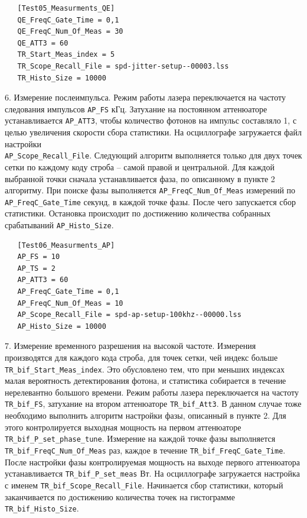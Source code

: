 \documentclass[12pt]{article}
\begin{document}
\begin{lstlisting}  
   [Test05_Measurments_QE]
   QE_FreqC_Gate_Time = 0,1
   QE_FreqC_Num_Of_Meas = 30
   QE_ATT3 = 60
   TR_Start_Meas_index = 5
   TR_Scope_Recall_File = spd-jitter-setup--00003.lss
   TR_Histo_Size = 10000
\end{lstlisting}

6. Измерение послеимпульса. Режим работы лазера переключается на частоту следования импульсов \verb|AP_FS| кГц. Затухание на постоянном аттенюаторе устанавливается \verb|AP_ATT3|, чтобы количество фотонов на импульс составляло 1, с целью увеличения скорости сбора статистики. На осциллографе загружается файл настройки \\ \verb|AP_Scope_Recall_File|. Следующий алгоритм выполняется только для двух точек сетки по каждому коду строба -- самой правой и центральной. Для каждой выбранной точки сначала устанавливается фаза, по описанному в пункте 2 алгоритму. При поиске фазы выполняется \verb|AP_FreqC_Num_Of_Meas| измерений по \verb|AP_FreqC_Gate_Time| секунд, в каждой точке фазы. После чего запускается сбор статистики. Остановка происходит по достижению количества собранных срабатываний \verb|AP_Histo_Size|.  


\begin{lstlisting}
   [Test06_Measurments_AP]
   AP_FS = 10
   AP_TS = 2
   AP_ATT3 = 60
   AP_FreqC_Gate_Time = 0,1
   AP_FreqC_Num_Of_Meas = 10
   AP_Scope_Recall_File = spd-ap-setup-100khz--00000.lss
   AP_Histo_Size = 10000
\end{lstlisting}

7. Измерение временного разрешения на высокой частоте. Измерения производятся для каждого кода строба, для точек сетки, чей индекс больше \verb|TR_bif_Start_Meas_index|. Это обусловлено тем, что при меньших индексах малая вероятность детектирования фотона, и статистика собирается в течение нерелевантно большого времени.  Режим работы лазера переключается на частоту \verb|TR_bif_FS|, затухание на втором аттенюаторе \verb|TR_bif_Att3|. В данном случае тоже необходимо выполнить алгоритм настройки фазы, описанный в пункте 2.  Для этого контролируется выходная мощность на первом аттенюаторе  \verb|TR_bif_P_set_phase_tune|. Измерение на каждой точке фазы выполняется \verb|TR_bif_FreqC_Num_Of_Meas| раз, каждое в течение \verb|TR_bif_FreqC_Gate_Time|.  После настройки фазы контролируемая мощность на выходе первого аттенюатора устанавливается \verb|TR_bif_P_set_meas| Вт. На осциллографе загружается настройка с именем \verb|TR_bif_Scope_Recall_File|. Начинается сбор статистики, который заканчивается по достижению количества точек на гистограмме \verb|TR_bif_Histo_Size|. 
\end{document}
